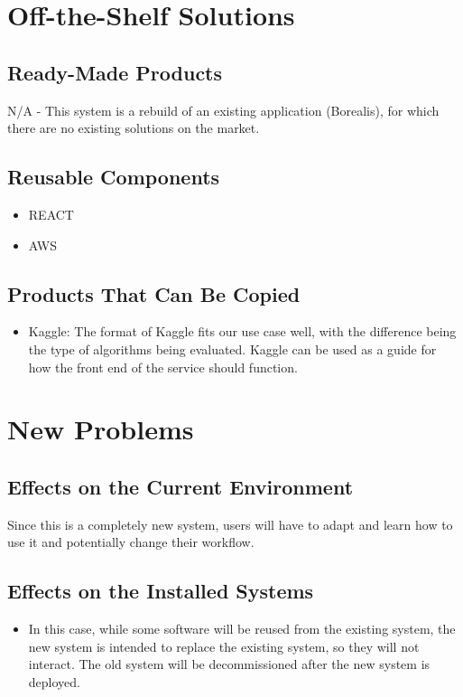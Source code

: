 \documentclass[12pt]{article}
\begin{document}
\section{Off-the-Shelf Solutions}
\subsection{Ready-Made Products}
N/A - This system is a rebuild of an existing application (Borealis), for which there are no existing solutions on the market.
\subsection{Reusable Components}
\begin{itemize}
    \item REACT
    \item AWS
\end{itemize}

\subsection{Products That Can Be Copied}
\begin{itemize}
    \item Kaggle: The format of Kaggle fits our use case well, with the difference being the type of algorithms being evaluated. Kaggle can be used as a guide for how the front end of the service should function.
\end{itemize}

\section{New Problems}
\subsection{Effects on the Current Environment}
Since this is a completely new system, users will have to adapt and learn how to use it and potentially change their workflow. 
\subsection{Effects on the Installed Systems}
\begin{itemize}
    \item In this case, while some software will be reused from the existing system, the new system is intended to replace the existing system, so they will not interact. The old system will be decommissioned after the new system is deployed.
\end{itemize}
\end{document}
